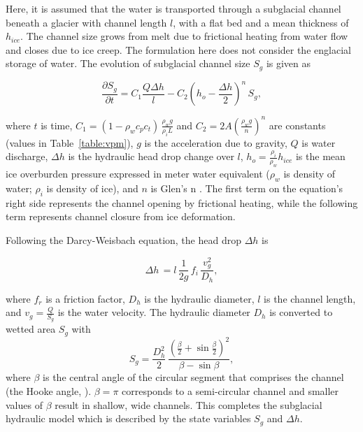 \documentclass[tc, manuscript]{copernicus}
\begin{document}
Here, it is assumed that the water is transported through a subglacial channel \citep[Figure~\ref{fig:cartoon}; ][]{rothlisberger1972} beneath a glacier with channel length $l$, with a flat bed and a mean thickness of $h_{ice}$.
The channel size grows from melt due to frictional heating from water flow and closes due to ice creep.
The formulation here does not consider the englacial storage of water.
The evolution of subglacial channel size $S_g$ is given as
\begin{linenomath*}
  \begin{equation}
    \label{eq:dS_dt}
    \frac{\partial S_g}{\partial t} = C_1 \frac{Q \Delta h}{l} - C_2 \left(h_{o}-\frac{\Delta h}{2}\right)^n\,S_g,
  \end{equation}
\end{linenomath*}
\noindent where $t$ is time, $C_1= (1-\rho_wc_pc_t)\,\frac{\rho_wg}{\rho_iL}$ and $C_2=2A(\frac{\rho_wg}{n})^n$ are constants (values in Table~\ref{table:vpm}), $g$ is the acceleration due to gravity, $Q$ is water discharge, $\Delta h$ is the hydraulic head drop change over $l$, $h_{o}= \frac{\rho_i}{\rho_w} h_{ice}$ is the mean ice overburden pressure expressed in meter water equivalent ($\rho_w$ is density of water; $\rho_i$ is density of ice), and $n$ is Glen's n \citep[usually $n=3$; ][]{glen1955}.
The first term on the equation's right side represents the channel opening by frictional heating, while the following term represents channel closure from ice deformation.


Following the Darcy-Weisbach equation, the head drop $\Delta h$ is
\begin{linenomath*}
  \begin{equation}
    \label{eq:dh}
    \Delta h \,  = l \,\frac{1}{2g} \,f_i\,\frac{v_{g}^{2}}{D_h},
  \end{equation}
\end{linenomath*}
\noindent where $f_r$ is a friction factor, $D_h$ is the hydraulic diameter, $l$ is the channel length, and $v_g=\frac{Q}{S_g}$ is the water velocity.
% 
The hydraulic diameter $D_h$ is converted to wetted area $S_g$ with
\begin{equation}
  \label{eq:Dh2S}
  S_g= \frac{D_h^2}{2}\,\frac{(\frac{\beta}{2}+\sin \frac{\beta}{2})^2}{\beta - \sin \beta},
\end{equation}
where $\beta$ is the central angle of the circular segment that comprises the channel (the Hooke angle, \citet{hooke1990}). $\beta =\pi$ corresponds to a semi-circular channel and smaller values of $\beta$ result in shallow, wide channels.
This completes the subglacial hydraulic model which is described by the state variables $S_g$ and $\Delta h$.
\end{document}
